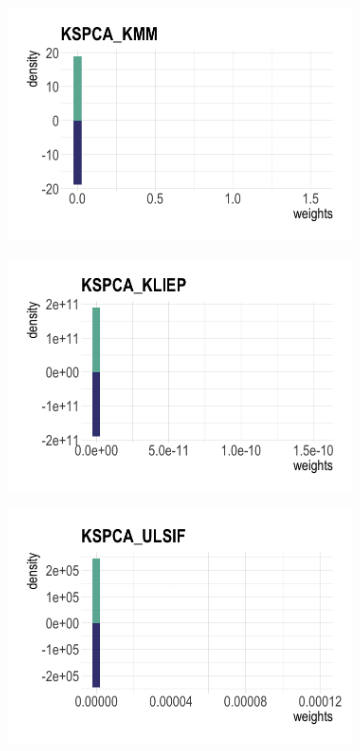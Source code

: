 \documentclass[a4paper,12pt]{article}
\begin{document}
\begin{figure}[H]
\begin{subfigure}{.32\textwidth}
  \label{fig:sfig1}
\end{subfigure}
\begin{subfigure}{.32\textwidth}
  \centering
  \includegraphics[width=\linewidth]{toy4.png}
  \label{fig:sfig2}
\end{subfigure} %
\begin{subfigure}{.32\textwidth}
  \centering
  \includegraphics[width=\linewidth]{toy5.png}
  \label{fig:sfig1}
\end{subfigure}%
\begin{subfigure}{.32\textwidth}
  \centering
  \includegraphics[width=\linewidth]{toy6.png}

\end{subfigure}
\end{figure}
\end{document}
